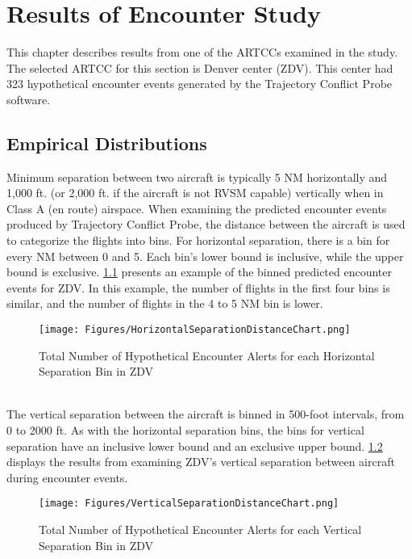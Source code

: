 \chapter{Results of Encounter Study}
This chapter describes results from one of the ARTCCs examined in the study. The selected ARTCC for this section is Denver center (ZDV). This center had 323 hypothetical encounter events generated by the Trajectory Conflict Probe software. 

\section{Empirical Distributions}
Minimum separation between two aircraft is typically 5 NM horizontally and 1,000 ft. (or 2,000 ft. if the aircraft is not RVSM capable) vertically when in Class A (en route) airspace. When examining the predicted encounter events produced by Trajectory Conflict Probe, the distance between the aircraft is used to categorize the flights into bins. For horizontal separation, there is a bin for every NM between 0 and 5. Each bin’s lower bound is inclusive, while the upper bound is exclusive. \ref{fig:horzsepdistchart} presents an example of the binned predicted encounter events for ZDV. In this example, the number of flights in the first four bins is similar, and the number of flights in the 4 to 5 NM bin is lower.

\begin{figure}[H]
\centering
\texttt{[image: Figures/HorizontalSeparationDistanceChart.png]}
\caption{Total Number of Hypothetical Encounter Alerts for each Horizontal Separation Bin in ZDV}
\label{fig:horzsepdistchart}
\end{figure}
~\\

The vertical separation between the aircraft is binned in 500-foot intervals, from 0 to 2000 ft. As with the horizontal separation bins, the bins for vertical separation have an inclusive lower bound and an exclusive upper bound. \ref{fig:vertsepdistchart} displays the results from examining ZDV’s vertical separation between aircraft during encounter events.

\begin{figure}[H]
\centering
\texttt{[image: Figures/VerticalSeparationDistanceChart.png]}
\caption{Total Number of Hypothetical Encounter Alerts for each Vertical Separation Bin in ZDV}
\label{fig:vertsepdistchart}
\end{figure}
~\\

